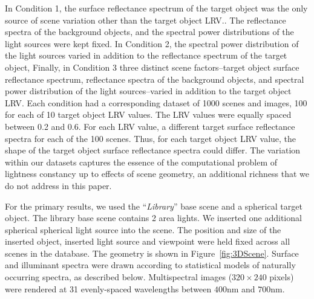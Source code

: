 \documentclass{jov}
\begin{document}
In Condition 1, the surface reflectance spectrum of the target object was the only source of scene variation other than the target object LRV..
The reflectance spectra of the background objects, and the spectral power distributions of the light sources were kept fixed.
In Condition 2, the spectral power distribution of the light sources varied in addition to the reflectance spectrum of the target object,
Finally, in Condition 3 three distinct scene factors--target object surface 
reflectance spectrum, reflectance spectra of the background objects, and
spectral power distribution of the light sources--varied in addition to the target object LRV.
Each condition had a corresponding dataset of 1000 scenes and images, 100 for each of 10 target object LRV values. The LRV values were equally spaced between 0.2 and 0.6. For each LRV value, a different target surface reflectance spectra for each of the 100 scenes. Thus, for each target object LRV value, the shape of the target object surface reflectance spectra could differ.
The variation within our datasets captures the essence of the computational problem of lightness constancy
up to effects of scene geometry, an additional richness that we do not address in this paper.

For the primary results, we used the ``{\it Library}'' base scene and a spherical target object.
The library base scene contains 2 area lights. 
We inserted one additional spherical spherical light source into the scene.
The position and size of the inserted object, inserted light source and viewpoint were held fixed across all 
scenes in the database. The geometry is shown in Figure~\ref{fig:3DScene}.
Surface and illuminant spectra were drawn according to statistical models of naturally occurring spectra, as described below.
Multispectral images ($320 \times 240$ pixels) were rendered at 31 evenly-spaced wavelengths between $400$nm and $700$nm.
\end{document}
